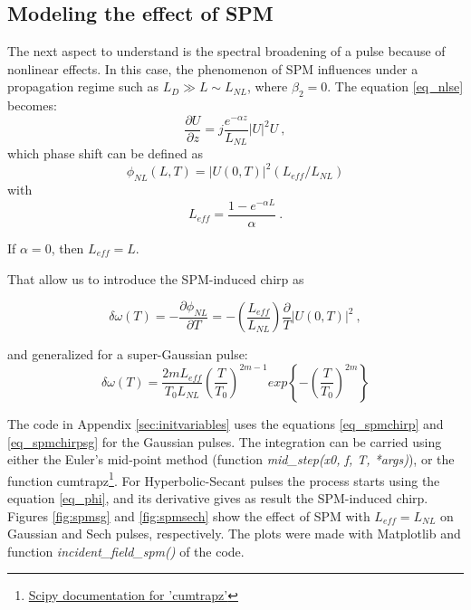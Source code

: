         \subsection{Modeling the effect of SPM}
        The next aspect to understand is the spectral broadening of a pulse because of nonlinear effects. In this case, the phenomenon of SPM influences under a propagation regime such as $ L_D \gg L \sim L_{NL} $, where $\beta_2=0$. The equation \eqref{eq_nlse} becomes: 
            \begin{equation}
                \frac{\partial U}{\partial z} = j\frac{e^{-\alpha z}}{L_{NL}}|U|^2 U \ ,
            \end{equation}
            which phase shift can be defined as 
            \begin{equation} \label{eq_phi}
                \phi_{NL}(L,T) = |U(0,T)|^2 (L_{eff}/L_{NL})
            \end{equation}
            with 
            \begin{equation} \label{eq_leff}
                L_{eff} = \frac{1-e^{-\alpha L}}{\alpha} \ .
            \end{equation}
            
            If  $\alpha = 0$, then $L_{eff} = L$.
            
            That allow us to introduce the SPM-induced chirp as
            
            \begin{equation} \label{eq_spmchirp}
                \delta \omega(T) = -\frac{\partial \phi_{NL}}{\partial T} = -\left( \frac{L_{eff}}{L_{NL}} \right) \frac{\partial }{T} |U(0,T)|^2 \ ,
            \end{equation}
        
        
         and generalized for a super-Gaussian pulse:
            \begin{equation} \label{eq_spmchirpsg}
                \delta \omega(T) = \frac{2m L_{eff}}{T_0 L_{NL}}\left( \frac{T}{T_0}\right)^{2m-1}  exp\left\{ -\left( \frac{T}{T_0}\right)^{2m}   \right\}
            \end{equation}
        
        The code in Appendix \ref{sec:initvariables} uses the equations \eqref{eq_spmchirp} and \eqref{eq_spmchirpsg} for the Gaussian pulses. The integration can be carried using either the Euler's mid-point method \citep{euler} (function \emph{mid\_step(x0, f, T, *args)}), or the function cumtrapz\footnote{\href{https://docs.scipy.org/doc/scipy-0.14.0/reference/generated/scipy.integrate.cumtrapz.html}{Scipy documentation for 'cumtrapz'}}. For Hyperbolic-Secant pulses the process starts using the equation \eqref{eq_phi}, and its derivative gives as result the SPM-induced chirp. Figures \ref{fig:spmsg} and \ref{fig:spmsech} show the effect of SPM with $L_{eff} = L_{NL}$ \citep{AgrawalBook} on Gaussian and Sech pulses, respectively. The plots were made with Matplotlib and function \emph{incident\_field\_spm()} of the code.
        
